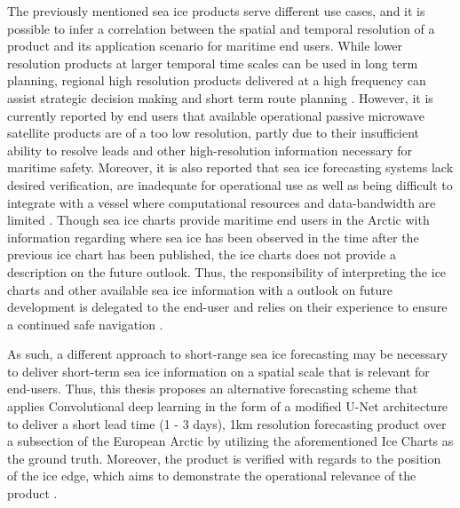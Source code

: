 \documentclass[../main/thesis.tex]{subfiles}
\begin{document}
The previously mentioned sea ice products serve different use cases, and it is possible to infer a correlation between the spatial and temporal resolution of a product and its application scenario for maritime end users. While lower resolution products at larger temporal time scales can be used in long term planning, regional high resolution products delivered at a high frequency can assist strategic decision making and short term route planning \citep{Wagner2020}. However, it is currently reported by end users that available operational passive microwave satellite products are of a too low resolution, partly due to their insufficient ability to resolve leads and other high-resolution information necessary for maritime safety. Moreover, it is also reported that sea ice forecasting systems lack desired verification, are inadequate for operational use as well as being difficult to integrate with a vessel where computational resources and data-bandwidth are limited \citep{Veland2021}. Though sea ice charts provide maritime end users in the Arctic with information regarding where sea ice has been observed in the time after the previous ice chart has been published, the ice charts does not provide a description on the future outlook. Thus, the responsibility of interpreting the ice charts and other available sea ice information with a outlook on future development is delegated to the end-user and relies on their experience to ensure a continued safe navigation \citep{Veland2021}.

As such, a different approach to short-range sea ice forecasting may be necessary to deliver short-term sea ice information on a spatial scale that is relevant for end-users. Thus, this thesis proposes an alternative forecasting scheme that applies Convolutional deep learning in the form of a modified U-Net architecture \citep{Ronneberger2015} to deliver a short lead time (1 - 3 days), 1km resolution forecasting product over a subsection of the European Arctic by utilizing the aforementioned Ice Charts as the ground truth. Moreover, the product is verified with regards to the position of the ice edge, which aims to demonstrate the operational relevance of the product \citep{Veland2021, Melsom2019}. 
\end{document}
